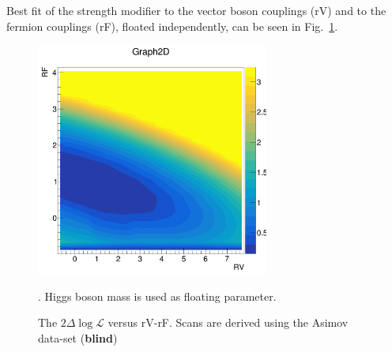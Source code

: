 Best fit of the strength modifier to the vector boson couplings (rV) and to
the fermion couplings (rF), floated independently, can be seen
in Fig.~\ref{results:rvrf}.
\begin{figure}[h!]
    \centering
    \includegraphics[width=0.681\textwidth]{figures/results/rV-rF}
    \caption{The $2\Delta\log{\mathcal{L}}$ versus rV-rF. Scans are derived
using the Asimov data-set ({\bf blind})}. Higgs boson mass is used as floating
parameter.
    \label{results:rvrf}
\end{figure}






%    
